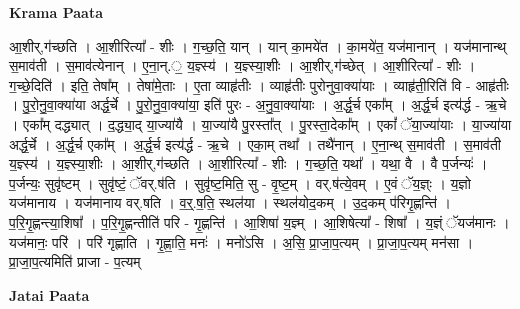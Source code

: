 \documentclass[17pt]{extarticle}
\begin{document}
\textbf{Krama Paata} \newline

आ॒शीर्,ग॑च्छति । आ॒शीरित्या᳚ - शीः । ग॒च्छ॒ति॒ यान् । यान् का॒मये॑त । का॒मये॑त॒ यज॑मानान् । यज॑मानान्थ् स॒माव॑ती । स॒माव॑त्येनान् । ए॒ना॒न्.॒ य॒ज्ञ्स्य॑ । य॒ज्ञ्स्या॒शीः । आ॒शीर्,ग॑च्छेत् । आ॒शीरित्या᳚ - शीः । ग॒च्छे॒दिति॑ । इति॒ तेषा᳚म् । तेषा॑मे॒ताः । ए॒ता व्याहृ॑तीः । व्याहृ॑तीः पुरोनुवा॒क्या॑याः । व्याहृ॑ती॒रिति॑ वि - आहृ॑तीः । पु॒रो॒नु॒वा॒क्या॑या अर्द्ध॒र्चे । पु॒रो॒नु॒वा॒क्या॑या॒ इति॑ पुरः - अ॒नु॒वा॒क्या॑याः । अ॒र्द्ध॒र्च एका᳚म् । अ॒र्द्ध॒र्च इत्य॑र्द्ध - ऋ॒चे । एका᳚म् दद्ध्यात् । द॒द्ध्या॒द् या॒ज्या॑यै । या॒ज्या॑यै पु॒रस्ता᳚त् । पु॒रस्ता॒देका᳚म् । एकां᳚ ॅया॒ज्या॑याः । या॒ज्या॑या अर्द्ध॒र्चे । अ॒र्द्ध॒र्च एका᳚म् । अ॒र्द्ध॒र्च इत्य॑र्द्ध - ऋ॒चे । एका॒म् तथा᳚ । तथै॑नान् । ए॒ना॒न्थ् स॒माव॑ती । स॒माव॑ती य॒ज्ञ्स्य॑ । य॒ज्ञ्स्या॒शीः । आ॒शीर्,ग॑च्छति । आ॒शीरित्या᳚ - शीः । ग॒च्छ॒ति॒ यथा᳚ । यथा॒ वै । वै प॒र्जन्यः॑ । प॒र्जन्यः॒ सुवृ॑ष्टम् । सुवृ॑ष्टं॒ ॅवर्.ष॑ति । सुवृ॑ष्ट॒मिति॒ सु - वृ॒ष्ट॒म् । वर्.ष॑त्ये॒वम् । ए॒वं ॅय॒ज्ञ्ः । य॒ज्ञो यज॑मानाय । यज॑मानाय वर्.षति । व॒र्॒.ष॒ति॒ स्थल॑या । स्थल॑योद॒कम् । उ॒द॒कम् प॑रिगृ॒ह्णन्ति॑ । प॒रि॒गृ॒ह्णन्त्या॒शिषा᳚ । प॒रि॒गृ॒ह्णन्तीति॑ परि - गृ॒ह्णन्ति॑ । आ॒शिषा॑ य॒ज्ञ्म् । आ॒शिषेत्या᳚ - शिषा᳚ । य॒ज्ञ्ं ॅयज॑मानः । यज॑मानः॒ परि॑ । परि॑ गृह्णाति । गृ॒ह्णा॒ति॒ मनः॑ । मनो॑ऽसि । अ॒सि॒ प्रा॒जा॒प॒त्यम् । प्रा॒जा॒प॒त्यम् मन॑सा । प्रा॒जा॒प॒त्यमिति॑ प्राजा - प॒त्यम् \newline

\textbf{Jatai Paata} \newline
\end{document}
